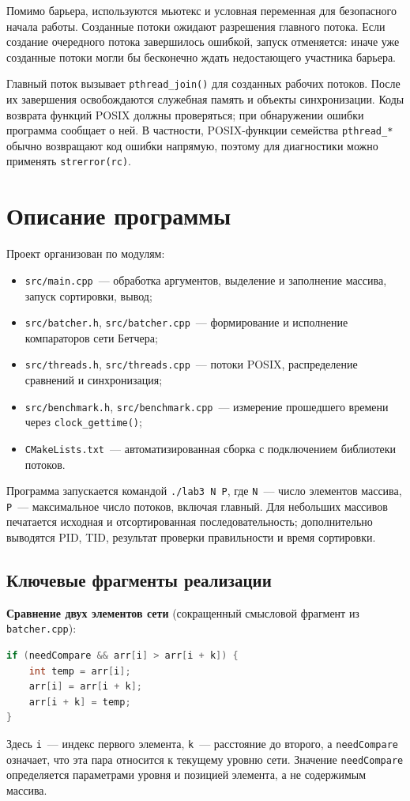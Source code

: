 \documentclass[12pt,a4paper,oneside]{article}
\begin{document}
Помимо барьера, используются мьютекс и условная переменная для безопасного начала работы. Созданные потоки ожидают разрешения главного потока. Если создание очередного потока завершилось ошибкой, запуск отменяется: иначе уже созданные потоки могли бы бесконечно ждать недостающего участника барьера.

Главный поток вызывает \texttt{pthread\_join()} для созданных рабочих потоков. После их завершения освобождаются служебная память и объекты синхронизации. Коды возврата функций POSIX должны проверяться; при обнаружении ошибки программа сообщает о ней. В частности, POSIX-функции семейства \texttt{pthread\_*} обычно возвращают код ошибки напрямую, поэтому для диагностики можно применять \texttt{strerror(rc)}.

\section{Описание программы}
Проект организован по модулям:
\begin{itemize}[noitemsep]
\item \texttt{src/main.cpp}~--- обработка аргументов, выделение и заполнение массива, запуск сортировки, вывод;
\item \texttt{src/batcher.h}, \texttt{src/batcher.cpp}~--- формирование и исполнение компараторов сети Бетчера;
\item \texttt{src/threads.h}, \texttt{src/threads.cpp}~--- потоки POSIX, распределение сравнений и синхронизация;
\item \texttt{src/benchmark.h}, \texttt{src/benchmark.cpp}~--- измерение прошедшего времени через \texttt{clock\_gettime()};
\item \texttt{CMakeLists.txt}~--- автоматизированная сборка с подключением библиотеки потоков.
\end{itemize}

Программа запускается командой \texttt{./lab3 N P}, где \texttt{N}~--- число элементов массива, \texttt{P}~--- максимальное число потоков, включая главный. Для небольших массивов печатается исходная и отсортированная последовательность; дополнительно выводятся PID, TID, результат проверки правильности и время сортировки.

\subsection{Ключевые фрагменты реализации}
\textbf{Сравнение двух элементов сети} (сокращенный смысловой фрагмент из \texttt{batcher.cpp}):
\begin{lstlisting}[language=C++]
if (needCompare && arr[i] > arr[i + k]) {
    int temp = arr[i];
    arr[i] = arr[i + k];
    arr[i + k] = temp;
}
\end{lstlisting}
Здесь \texttt{i}~--- индекс первого элемента, \texttt{k}~--- расстояние до второго, а \texttt{needCompare} означает, что эта пара относится к текущему уровню сети. Значение \texttt{needCompare} определяется параметрами уровня и позицией элемента, а не содержимым массива.
\end{document}
